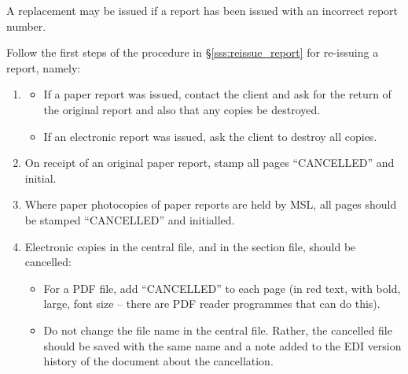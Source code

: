 A replacement may be issued if a report has been issued with an incorrect report number. 

Follow the first steps of the procedure in \S\ref{sss:reissue_report} for re-issuing a report, namely:

\begin{enumerate}
\item 
\begin{itemize} 
\item If a paper report was issued, contact the client and ask for the return of the original report and also that any copies be destroyed. 

\item If an electronic report was issued, ask the client to destroy all copies.
\end{itemize}

\item On receipt of an original paper report, stamp all pages ``{\color{red}CANCELLED}” and initial.

\item Where paper photocopies of paper reports are held by MSL, all pages should be stamped ``{\color{red}CANCELLED}” and initialled.

\item Electronic copies in the central file, and in the section file, should be cancelled:
\begin{itemize}
\item For a PDF file, add “{\color{red}CANCELLED}” to each page (in red text, with bold, large, font size – there are PDF reader programmes that can do this). 
\item Do not change the file name in the central file. Rather, the cancelled file should be saved with the same name and a note added to the EDI version history of the document about the cancellation. 
\end{itemize}
\end{enumerate}

